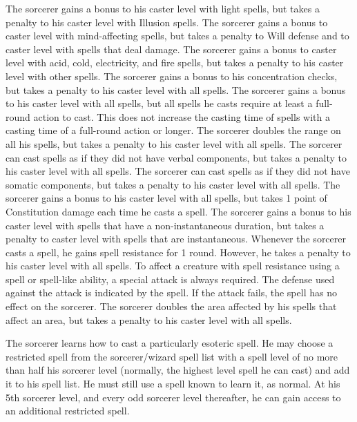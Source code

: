  The sorcerer gains a bonus to his caster level with light spells, but takes a penalty to his caster level with Illusion spells.
 The sorcerer gains a bonus to caster level with mind-affecting spells, but takes a penalty to Will defense and to caster level with spells that deal damage.
 The sorcerer gains a bonus to caster level with acid, cold, electricity, and fire spells, but takes a penalty to his caster level with other spells.
 The sorcerer gains a bonus to his concentration checks, but takes a penalty to his caster level with all spells.
 The sorcerer gains a bonus to his caster level with all spells, but all spells he casts require at least a full-round action to cast. This does not increase the casting time of spells with a casting time of a full-round action or longer.
 The sorcerer doubles the range on all his spells, but takes a penalty to his caster level with all spells.
 The sorcerer can cast spells as if they did not have verbal components, but takes a penalty to his caster level with all spells.
 The sorcerer can cast spells as if they did not have somatic components, but takes a penalty to his caster level with all spells. 
 The sorcerer gains a bonus to his caster level with all spells, but takes 1 point of Constitution damage each time he casts a spell.
 The sorcerer gains a bonus to his caster level with spells that have a non-instantaneous duration, but takes a penalty to caster level with spells that are instantaneous.
 Whenever the sorcerer casts a spell, he gains spell resistance for 1 round. However, he takes a penalty to his caster level with all spells. To affect a creature with spell resistance using a spell or spell-like ability, a special attack is always required. The defense used against the attack is indicated by the spell. If the attack fails, the spell has no effect on the sorcerer.
 The sorcerer doubles the area affected by his spells that affect an area, but takes a penalty to his caster level with all spells.

 The sorcerer learns how to cast a particularly esoteric spell. He may choose a restricted spell from the sorcerer/wizard spell list with a spell level of no more than half his sorcerer level (normally, the highest level spell he can cast) and add it to his spell list. He must still use a spell known to learn it, as normal. At his 5th sorcerer level, and every odd sorcerer level thereafter, he can gain access to an additional restricted spell.

